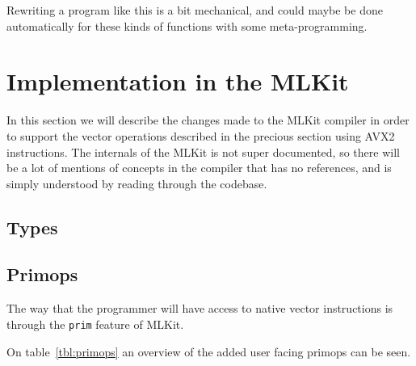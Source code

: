 \documentclass{article}
\begin{document}
Rewriting a program like this is a bit mechanical, and could maybe be done automatically for these kinds of functions with some meta-programming.

\section{Implementation in the MLKit}
In this section we will describe the changes made to the MLKit compiler in order to support the vector operations described in the precious section using AVX2 instructions. The internals of the MLKit is not super documented, so there will be a lot of mentions of concepts in the compiler that has no references, and is simply understood by reading through the codebase.

\subsection{Types}

\subsection{Primops}
The way that the programmer will have access to native vector instructions is through the \texttt{prim} feature of MLKit. 

On table~\ref{tbl:primops} an overview of the added user facing primops can be seen.
\end{document}
